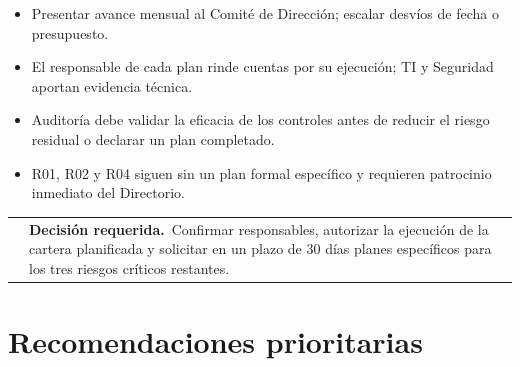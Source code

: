 \documentclass[10pt,a4paper]{article}
\makeatletter
\newcommand{\decisionbox}[1]{%
\noindent\begin{tabularx}{\linewidth}{@{}p{0.2cm} X@{}}
\color{accent}\rule{0.6pt}{\baselineskip} & \small\textbf{Decisión requerida.}\ #1
\end{tabularx}\vspace{1mm}}
\makeatother
\begin{document}
\begin{itemize}
  \item Presentar avance mensual al Comité de Dirección; escalar desvíos de fecha o presupuesto.
  \item El responsable de cada plan rinde cuentas por su ejecución; TI y Seguridad aportan evidencia técnica.
  \item Auditoría debe validar la eficacia de los controles antes de reducir el riesgo residual o declarar un plan completado.
  \item R01, R02 y R04 siguen sin un plan formal específico y requieren patrocinio inmediato del Directorio.
\end{itemize}

\decisionbox{Confirmar responsables, autorizar la ejecución de la cartera planificada y solicitar en un plazo de 30 días planes específicos para los tres riesgos críticos restantes.}

\newpage

\section*{Recomendaciones prioritarias}
\end{document}
